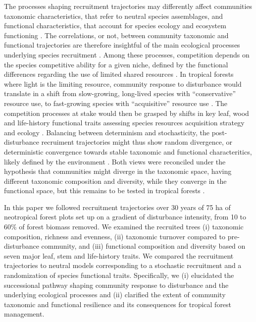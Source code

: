 \documentclass[fleqn,10pt]{ArtEcoFoG} %
\begin{document}
The processes shaping recruitment trajectories may differently affect
communities taxonomic characteristics, that refer to neutral species
assemblages, and functional characteristics, that account for species
ecology and ecosystem functioning \citep{Violle2007b, Kunstler2016}. The
correlations, or not, between community taxonomic and functional
trajectories are therefore insightful of the main ecological processes underlying
species recruitment \citep{Fukami2005}. Among these processes, competition depends on the species competitive ability for a given niche,
defined by the functional differences regarding the use of limited
shared resources \citep{Perronne2017}. In tropical forests where light
is the limiting resource, community response to disturbance would translate in a shift
from slow-growing, long-lived species with ``conservative'' resource
use, to fast-growing species with ``acquisitive'' resource use
\citep{Denslow1980, Molino2001, Bongers2009}. The competition processes at stake would then be grasped by shifts in key
leaf, wood and life-history functional traits assessing species
resources acquisition strategy and ecology
\citep{Wright2004, Chave2009b, Herault2011}. Balancing between determinism and stochasticity, the post-disturbance recruiment trajectories might thus show random divergence, or deterministic convergence towards stable
taxonomic and functional characteritics, likely defined by the
environment \citep{Clements1916, Diamond1975}. Both views were
reconciled under the hypothesis that communities might diverge in the
taxonomic space, having different taxonomic composition and diversity,
while they converge in the functional space, but this remains to be
tested in tropical forests \citep{Fukami2005, Li2018}.

In this paper we followed recruitment trajectories over 30 years of 75
ha of neotropical forest plots set up on a gradient of disturbance
intensity, from 10 to 60\% of forest biomass removed. We examined the
recruited trees (i) taxonomic composition, richness and evenness, (ii)
taxonomic turnover compared to pre-disturbance community, and (iii)
functional composition and diversity based on seven major leaf, stem and
life-history traits. We compared the recruitment trajectories to neutral
models corresponding to a stochastic recruitment and a randomization of
species functional traits. Specifically, we (i) elucidated the
successional pathway shaping community response to disturbance and the
underlying ecological processes and (ii) clarified the extent of
community taxonomic and functional resilience and its consequences for
tropical forest management.
\end{document}
